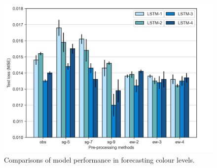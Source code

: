 \begin{figure}[t]
    \centering
    \includegraphics[width=0.6\columnwidth]{imgs/results/feature-engineering/colour-input-1-4-comparison.png}
    \caption{Comparisons of model performance in forecasting colour levels.}
    \label{fig:colour-feature-engineering}
 \end{figure}

